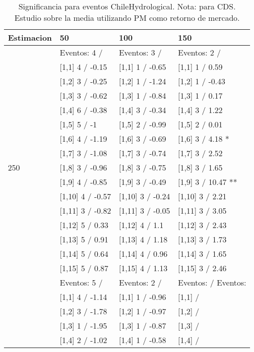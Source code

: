 \begin{table}

\caption{Significancia para eventos ChileHydrological. Nota: para CDS. Estudio sobre la media utilizando PM como retorno de mercado.}
\centering
\begin{tabular}[t]{llll}
\toprule
Estimacion & 50 & 100 & 150\\
\midrule
 & Eventos:  4 / & Eventos:  3 / & Eventos:  2 /\\
 & {}[1,1] 4  / -0.15 & {}[1,1] 1  / -0.65 & {}[1,1] 1  / 0.59\\
 & {}[1,2] 3  / -0.25 & {}[1,2] 1  / -1.24 & {}[1,2] 1  / -0.43\\
 & {}[1,3] 3  / -0.62 & {}[1,3] 1  / -0.84 & {}[1,3] 1  / 0.17\\
 & {}[1,4] 6  / -0.38 & {}[1,4] 3  / -0.34 & {}[1,4] 3  / 1.22\\
\addlinespace
 & {}[1,5] 5  / -1 & {}[1,5] 2  / -0.99 & {}[1,5] 2  / 0.01\\
 & {}[1,6] 4  / -1.19 & {}[1,6] 3  / -0.69 & {}[1,6] 3  / 4.18 *\\
 & {}[1,7] 3  / -1.08 & {}[1,7] 3  / -0.74 & {}[1,7] 3  / 2.52\\
250 & {}[1,8] 3  / -0.96 & {}[1,8] 3  / -0.75 & {}[1,8] 3  / 1.65\\
 & {}[1,9] 4  / -0.85 & {}[1,9] 3  / -0.49 & {}[1,9] 3  / 10.47 **\\
\addlinespace
 & {}[1,10] 4  / -0.57 & {}[1,10] 3  / -0.24 & {}[1,10] 3  / 2.21\\
 & {}[1,11] 3  / -0.82 & {}[1,11] 3  / -0.05 & {}[1,11] 3  / 3.05\\
 & {}[1,12] 5  / 0.33 & {}[1,12] 4  / 1.1 & {}[1,12] 3  / 2.43\\
 & {}[1,13] 5  / 0.91 & {}[1,13] 4  / 1.18 & {}[1,13] 3  / 1.73\\
 & {}[1,14] 5  / 0.64 & {}[1,14] 4  / 0.96 & {}[1,14] 3  / 1.65\\
\addlinespace
 & {}[1,15] 5  / 0.87 & {}[1,15] 4  / 1.13 & {}[1,15] 3  / 2.46\\
 & Eventos:  5 / & Eventos:  2 / & Eventos:   / Eventos:\\
 & {}[1,1] 4  / -1.14 & {}[1,1] 1  / -0.96 & {}[1,1]  /\\
 & {}[1,2] 3  / -1.78 & {}[1,2] 1  / -0.97 & {}[1,2]  /\\
 & {}[1,3] 1  / -1.95 & {}[1,3] 1  / -0.87 & {}[1,3]  /\\
\addlinespace
 & {}[1,4] 2  / -1.02 & {}[1,4] 1  / -0.58 & {}[1,4]  /\\

\end{tabular}
\end{table}
